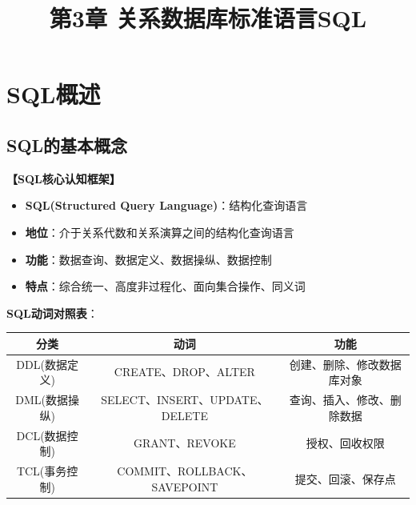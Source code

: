 \documentclass[12pt, a4paper]{article}
\title{\textbf{第3章 关系数据库标准语言SQL}}
\date{}
\newenvironment{bluebox}[1]{%
  \begin{trivlist}
  \item[\hskip\labelsep \textbf{#1}]
  \setlength{\parskip}{0.5ex}
  \setlength{\itemsep}{0.5ex}
}{%
  \end{trivlist}
}
\begin{document}
\maketitle
\thispagestyle{empty}
\newpage

\section{SQL概述}

\subsection{SQL的基本概念}

\begin{bluebox}{核心概念框架}
	\textbf{【SQL核心认知框架】}

	\begin{itemize}[leftmargin=*, nosep]
		\item \textbf{SQL(Structured Query Language)}：结构化查询语言
		\item \textbf{地位}：介于关系代数和关系演算之间的结构化查询语言
		\item \textbf{功能}：数据查询、数据定义、数据操纵、数据控制
		\item \textbf{特点}：综合统一、高度非过程化、面向集合操作、同义词
	\end{itemize}

	\textbf{SQL动词对照表}：

	\begin{tabular}{|c|c|c|}
		\hline
		\textbf{分类} & \textbf{动词}                 & \textbf{功能}   \\
		\hline
		DDL(数据定义)   & CREATE、DROP、ALTER           & 创建、删除、修改数据库对象 \\
		\hline
		DML(数据操纵)   & SELECT、INSERT、UPDATE、DELETE & 查询、插入、修改、删除数据 \\
		\hline
		DCL(数据控制)   & GRANT、REVOKE                & 授权、回收权限       \\
		\hline
		TCL(事务控制)   & COMMIT、ROLLBACK、SAVEPOINT   & 提交、回滚、保存点     \\
		\hline
	\end{tabular}
\end{bluebox}
\end{document}
